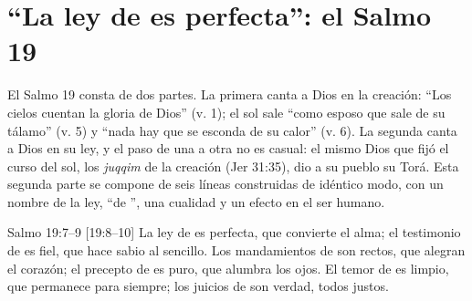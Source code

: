 \section{“La ley de \SENOR{} es perfecta”: el Salmo 19}

El Salmo 19 consta de dos partes. La primera canta a Dios en la creación: ``Los cielos cuentan la gloria de Dios'' (v. 1); el sol sale ``como esposo que sale de su tálamo'' (v. 5) y ``nada hay que se esconda de su calor'' (v. 6). La segunda canta a Dios en su ley, y el paso de una a otra no es casual: el mismo Dios que fijó el curso del sol, los \emph{juqqim} de la creación (Jer 31:35), dio a su pueblo su Torá. Esta segunda parte se compone de seis líneas construidas de idéntico modo, con un nombre de la ley, ``de \SENOR'', una cualidad y un efecto en el ser humano.

\begin{verso}{Salmo 19:7–9 [19:8–10]}
La ley de \SENOR{} es perfecta, que convierte el alma; el testimonio de \SENOR{} es fiel, que hace sabio al sencillo. Los mandamientos de \SENOR{} son rectos, que alegran el corazón; el precepto de \SENOR{} es puro, que alumbra los ojos. El temor de \SENOR{} es limpio, que permanece para siempre; los juicios de \SENOR{} son verdad, todos justos.
\end{verso}

